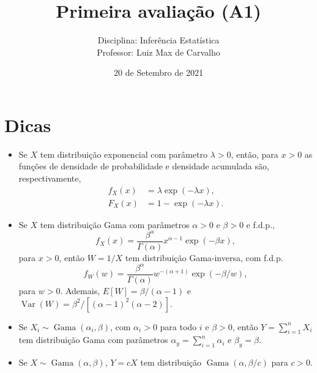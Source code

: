 \documentclass[a4paper,10pt, notitlepage]{report}
\title{Primeira avaliação (A1)}
\author{Disciplina: Inferência Estatística \\ Professor: Luiz Max de Carvalho}
\date{20 de Setembro de 2021}
\newcommand{\vr}{\operatorname{Var}} %
\begin{document}
\maketitle


\begin{center}
\end{center}

\section*{Dicas}
\begin{itemize}
 \item Se $X$ tem distribuição exponencial com parâmetro $\lambda > 0$, então, para $x>0$ as funções de densidade de probabilidade e densidade acumulada são, respectivamente,
 \begin{align*}
 f_X(x) &= \lambda \exp\left(-\lambda x\right),\\
 F_X(x) &= 1 - \exp(-\lambda x).
 \end{align*}
 \item Se $X$ tem distribuição Gama com parâmetros $\alpha >0$ e $\beta >0$ e f.d.p.,
 $$
 f_X(x) = \frac{\beta^\alpha}{\Gamma(\alpha)} x^{\alpha - 1} \exp(-\beta x),
 $$
 para $x>0$, então $W = 1/X$ tem distribuição Gama-inversa, com f.d.p.
 $$
 f_W(w) = \frac{\beta^\alpha}{\Gamma(\alpha)} w^{-(\alpha + 1)} \exp(-\beta/w),
 $$
 para $w>0$.
 Ademais, $E[W] = \beta/(\alpha - 1)$ e $\vr(W) = \beta^2/[(\alpha-1)^2(\alpha-2)]$.
\item Se $X_i \sim \operatorname{Gama}(\alpha_i, \beta)$, com $\alpha_i >0$  para todo $i$ e $\beta>0$, então $Y = \sum_{i=1}^n X_i$ tem distribuição Gama com parâmetros $\alpha_y = \sum_{i=1}^n \alpha_i$ e $\beta_y = \beta$.
\item Se $X \sim \operatorname{Gama}(\alpha, \beta)$, $Y = cX$ tem distribuição $\operatorname{Gama}(\alpha, \beta/c)$ para $c>0$.
\end{itemize}
 
\end{document}
